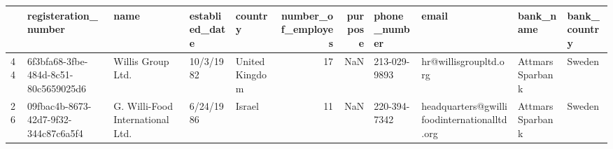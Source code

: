 \begin{tabular}{lllllrrllll}
\toprule
{} &                  registeration\_number &                              name & establied\_date &         country &  number\_of\_employes &  purpose &  phone\_number &                                        email &         bank\_name & bank\_country \\
\midrule
44 &  6f3bfa68-3fbe-484d-8c51-80c5659025d6 &                 Willis Group Ltd. &      10/3/1982 &  United Kingdom &                  17 &      NaN &  213-029-9893 &                        hr@willisgroupltd.org &  Attmars Sparbank &       Sweden \\
26 &  09fbac4b-8673-42d7-9f32-344c87c6a5f4 &  G. Willi-Food International Ltd. &      6/24/1986 &          Israel &                  11 &      NaN &  220-394-7342 &  headquarters@gwillifoodinternationalltd.org &  Attmars Sparbank &       Sweden \\
\bottomrule
\end{tabular}
